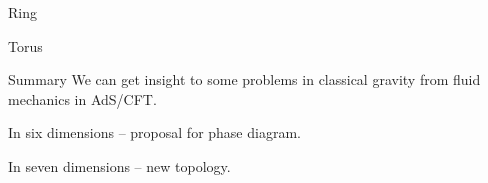 \documentclass{beamer}
\begin{document}

\begin{frame}{Ring}
%
 \begin{center}
   
 \end{center}
%
\end{frame}


\begin{frame}{Torus}
%
 \begin{center}
   
 \end{center}
%
\end{frame}


\begin{frame}{Summary}
%
 We can get insight to some problems in classical gravity from fluid mechanics in AdS/CFT.

 \vp In six dimensions -- proposal for phase diagram.

 \vp In seven dimensions -- new topology.
%
\end{frame}


\end{document}
